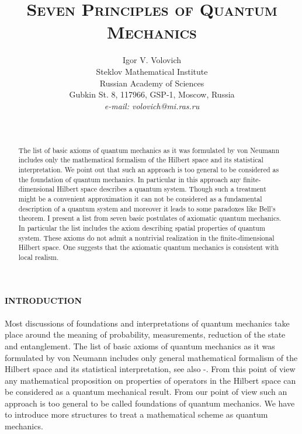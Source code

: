 \documentclass[12pt]{article}
\begin{document}
\title{
\textsc{\bf Seven Principles of Quantum Mechanics}}

\author{
 Igor V. Volovich
\\ $~~~$\\
\textsf{Steklov Mathematical Institute}\\
\textsf{Russian Academy of Sciences}\\
\textsf{Gubkin St. 8, 117966, GSP-1, Moscow, Russia}\\
\emph{e-mail: volovich@mi.ras.ru} }
\date {~}
\maketitle
\begin{abstract}
 The list of basic axioms of quantum mechanics as it
  was formulated by von
 Neumann  includes only the mathematical formalism of the Hilbert
 space and its statistical interpretation. We point out that such
 an approach is too general to be considered as the foundation of
 quantum mechanics. In particular in this approach any
 finite-dimensional Hilbert space  describes a quantum system.
 Though such a treatment might be a convenient approximation it can
 not be considered as a fundamental description of a quantum system
 and moreover it leads to some paradoxes like Bell's theorem.
  I present a list from seven basic postulates of axiomatic
 quantum mechanics.  In particular the list includes the axiom
 describing spatial properties of quantum system. These axioms do
 not admit a nontrivial realization in the finite-dimensional
 Hilbert space. One suggests that the axiomatic quantum mechanics
is consistent with local realism.
\end{abstract}
\newpage


{\bf INTRODUCTION}\\~\\

Most discussions of  foundations and interpretations of quantum
mechanics take place around the meaning of probability,
measurements, reduction of the state and entanglement. The list of
basic axioms of quantum mechanics as it was formulated by von
Neumann \cite{Neu} includes only  general mathematical formalism
of the Hilbert space and its statistical interpretation, see also
\cite{Seg}-\cite{QT}.
 From this point of view any
mathematical proposition on properties of operators in the Hilbert
space can be considered as a quantum mechanical result. From our
point of view such an approach is too general to be called
foundations of quantum mechanics. We have to introduce more
structures to treat a mathematical scheme as quantum mechanics.
\end{document}
